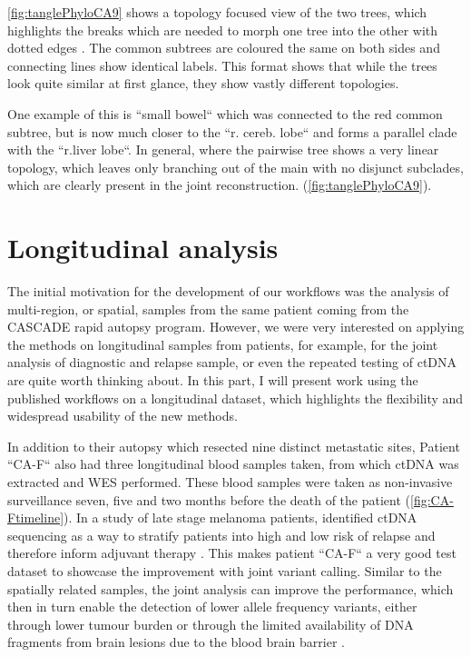\autoref{fig:tanglePhyloCA9} shows a topology focused view of the two trees, which highlights the breaks which are needed to morph one tree into the other with dotted edges \cite{Vienne2018}. The common subtrees are coloured the same on both sides and connecting lines show identical labels. This format shows that while the trees look quite similar at first glance, they show vastly different topologies.


One example of this is ``small bowel`` which was connected to the red common subtree, but is now much closer to the ``r. cereb. lobe`` and forms a parallel clade with the ``r.liver lobe``. In general, where the pairwise tree shows a very linear topology, which leaves only branching out of the main with no disjunct subclades, which are clearly present in the joint reconstruction.  (\autoref{fig:tanglePhyloCA9}).


\section[Longitudinal analysis]{Longitudinal analysis}
\label{variantcalling-sec:longitudinal}

The initial motivation for the development of our workflows was the analysis of multi-region, or spatial, samples from the same patient coming from the CASCADE rapid autopsy program. However, we were very interested on applying the methods on longitudinal samples from patients, for example, for the joint analysis of diagnostic and relapse sample, or even the repeated testing of ctDNA are quite worth thinking about. In this part, I will present work using the published workflows on a longitudinal dataset, which highlights the flexibility and widespread usability of the new methods.

In addition to their autopsy which resected nine distinct metastatic sites, Patient ``CA-F`` also had three longitudinal blood samples taken, from which ctDNA was extracted and WES performed. These blood samples were taken as non-invasive surveillance seven, five and two months before the death of the patient (\autoref{fig:CA-Ftimeline}). In a study of late stage melanoma patients,  identified ctDNA sequencing as a way to stratify patients into high and low risk of relapse and therefore inform adjuvant therapy \cite{Tan2019}. This makes patient ``CA-F`` a very good test dataset to showcase the improvement with joint variant calling. Similar to the spatially related samples, the joint analysis can improve the performance, which then in turn enable the detection of lower allele frequency variants, either through lower tumour burden or through the limited availability of DNA fragments from brain lesions due to the blood brain barrier \cite{2014}.

